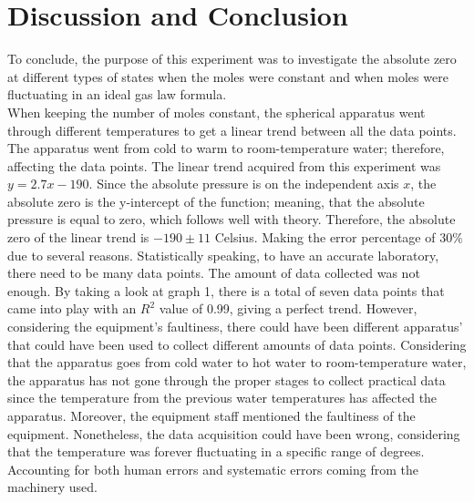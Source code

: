 \documentclass[11pt]{article}
\begin{document}
\section*{Discussion and Conclusion}
To conclude, the purpose of this experiment was to investigate the absolute zero at different types of states when the moles were constant and when moles were fluctuating in an ideal gas law formula.\\
When keeping the number of moles constant, the spherical apparatus went through different temperatures to get a linear trend between all the data points. The apparatus went from cold to warm to room-temperature water; therefore, affecting the data points. The linear trend acquired from this experiment was $y=2.7x-190$. Since the absolute pressure is on the independent axis $x$, the absolute zero is the y-intercept of the function; meaning, that the absolute pressure is equal to zero, which follows well with theory. Therefore, the absolute zero of the linear trend is $-190\pm11$ Celsius. Making the error percentage of $30\%$ due to several reasons. Statistically speaking, to have an accurate laboratory, there need to be many data points. The amount of data collected was not enough. By taking a look at graph 1, there is a total of seven data points that came into play with an $R^2$ value of 0.99, giving a perfect trend.  However, considering the equipment's faultiness, there could have been different apparatus' that could have been used to collect different amounts of data points. Considering that the apparatus goes from cold water to hot water to room-temperature water, the apparatus has not gone through the proper stages to collect practical data since the temperature from the previous water temperatures has affected the apparatus. Moreover, the equipment staff mentioned the faultiness of the equipment. Nonetheless, the data acquisition could have been wrong, considering that the temperature was forever fluctuating in a specific range of degrees. Accounting for both human errors and systematic errors coming from the machinery used. \\
\end{document}
